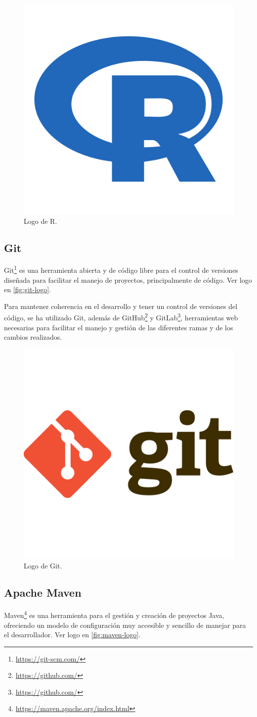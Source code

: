 \begin{figure}[htpb]
    \centering
    \includegraphics[width=0.2\linewidth]{images/logos/R-Logo.png} 
    \caption{Logo de R.}
    \label{fig:r-logo}
\end{figure}


\subsection*{Git}

Git\footnote{\href{https://git-scm.com/}{https://git-scm.com/}} es una herramienta
abierta y de código libre para el control de versiones diseñada para facilitar el
manejo de proyectos, principalmente de código. Ver logo en \autoref{fig:git-logo}.

Para mantener coherencia en el desarrollo y tener un control de versiones del
código, se ha utilizado Git, además de 
GitHub\footnote{\href{https://github.com/}{https://github.com/}} y
GitLab\footnote{\href{https://github.com/}{https://github.com/}}, herramientas web
necesarias para facilitar el manejo y gestión de las diferentes ramas y de los
cambios realizados.


\begin{figure}[htpb]
    \centering
    \includegraphics[width=0.3\linewidth]{images/logos/git-logo.png} 
    \caption{Logo de Git.}
    \label{fig:git-logo}
\end{figure}


\subsection*{Apache Maven}

Maven\footnote{\href{https://maven.apache.org/index.html}{https://maven.apache.org/index.html}}
es una herramienta para el gestión y creación de proyectos Java, ofreciendo un modelo
de configuración muy accesible y sencillo de manejar para el desarrollador. 
Ver logo en \autoref{fig:maven-logo}.

